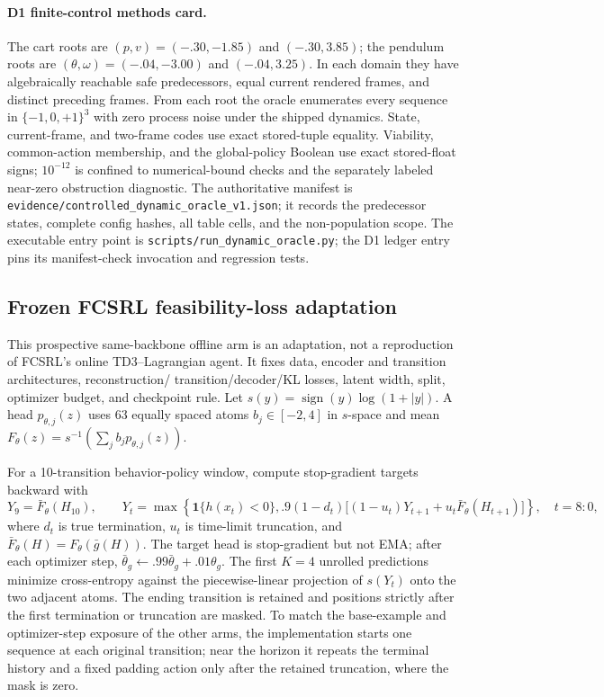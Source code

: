 \paragraph{D1 finite-control methods card.}
The cart roots are $(p,v)=(-.30,-1.85)$ and $(-.30,3.85)$; the pendulum roots are
$(\theta,\omega)=(-.04,-3.00)$ and $(-.04,3.25)$.  In each domain they have algebraically reachable
safe predecessors, equal current rendered frames, and distinct preceding frames.  From each root the
oracle enumerates every sequence in $\{-1,0,+1\}^3$ with zero process noise under the shipped
dynamics.  State, current-frame, and two-frame codes use exact stored-tuple equality.  Viability,
common-action membership, and the global-policy Boolean use exact stored-float signs;
$10^{-12}$ is confined to numerical-bound checks and the separately labeled near-zero obstruction
diagnostic.  The authoritative manifest is
\nolinkurl{evidence/controlled_dynamic_oracle_v1.json}; it records the predecessor states, complete
config hashes, all table cells, and the non-population scope.  The executable entry point is
\texttt{scripts/run\_dynamic\_oracle.py}; the D1 ledger entry pins its manifest-check invocation and
regression tests.

\subsection{Frozen FCSRL feasibility-loss adaptation}
\label{app:fcsrl-baseline}

\begingroup\footnotesize
This prospective same-backbone offline arm is an adaptation, not a reproduction of FCSRL's online
TD3--Lagrangian agent.  It fixes data, encoder and transition architectures, reconstruction/
transition/decoder/KL losses, latent width, split, optimizer budget, and checkpoint rule.  Let
$s(y)=\operatorname{sign}(y)\log(1+|y|)$.  A head $p_{\theta,j}(z)$ uses 63 equally spaced atoms
$b_j\in[-2,4]$ in $s$-space and mean
$F_\theta(z)=s^{-1}(\sum_j b_jp_{\theta,j}(z))$.

For a 10-transition behavior-policy window, compute stop-gradient targets backward with
\[
 Y_9=\bar F_\theta(H_{10}),\qquad
 Y_t=\max\!\left\{\mathbf 1\{h(x_t)<0\},
 .9(1-d_t)\big[(1-u_t)Y_{t+1}+u_t\bar F_\theta(H_{t+1})\big]\right\},
 \quad t=8{:}0,
\]
where $d_t$ is true termination, $u_t$ is time-limit truncation, and
$\bar F_\theta(H)=F_\theta(\bar g(H))$.  The target head is stop-gradient but not EMA; after each
optimizer step, $\bar\theta_g\leftarrow.99\bar\theta_g+.01\theta_g$.  The first $K=4$ unrolled
predictions minimize cross-entropy against the piecewise-linear projection of $s(Y_t)$ onto the two
adjacent atoms.  The ending transition is retained and positions strictly after the first
termination or truncation are masked.  To match the base-example and optimizer-step exposure of the
other arms, the implementation starts one sequence at each original transition; near the horizon it
repeats the terminal history and a fixed padding action only after the retained truncation, where the
mask is zero.

